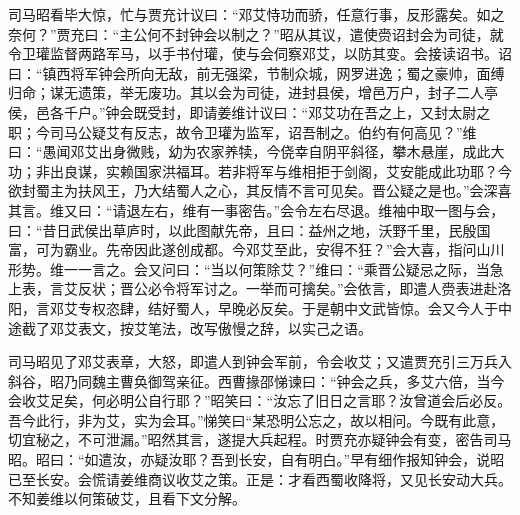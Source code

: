 司马昭看毕大惊，忙与贾充计议曰：“邓艾恃功而骄，任意行事，反形露矣。如之奈何？”贾充曰：“主公何不封钟会以制之？”昭从其议，遣使赍诏封会为司徒，就令卫瓘监督两路军马，以手书付瓘，使与会伺察邓艾，以防其变。会接读诏书。诏曰：“镇西将军钟会所向无敌，前无强梁，节制众城，网罗进逸；蜀之豪帅，面缚归命；谋无遗策，举无废功。其以会为司徒，进封县侯，增邑万户，封子二人亭侯，邑各千户。”钟会既受封，即请姜维计议曰：“邓艾功在吾之上，又封太尉之职；今司马公疑艾有反志，故令卫瓘为监军，诏吾制之。伯约有何高见？”维曰：“愚闻邓艾出身微贱，幼为农家养犊，今侥幸自阴平斜径，攀木悬崖，成此大功；非出良谋，实赖国家洪福耳。若非将军与维相拒于剑阁，艾安能成此功耶？今欲封蜀主为扶风王，乃大结蜀人之心，其反情不言可见矣。晋公疑之是也。”会深喜其言。维又曰：“请退左右，维有一事密告。”会令左右尽退。维袖中取一图与会，曰：“昔日武侯出草庐时，以此图献先帝，且曰：益州之地，沃野千里，民殷国富，可为霸业。先帝因此遂创成都。今邓艾至此，安得不狂？”会大喜，指问山川形势。维一一言之。会又问曰：“当以何策除艾？”维曰：“乘晋公疑忌之际，当急上表，言艾反状；晋公必令将军讨之。一举而可擒矣。”会依言，即遣人赍表进赴洛阳，言邓艾专权恣肆，结好蜀人，早晚必反矣。于是朝中文武皆惊。会又今人于中途截了邓艾表文，按艾笔法，改写傲慢之辞，以实己之语。

司马昭见了邓艾表章，大怒，即遣人到钟会军前，令会收艾；又遣贾充引三万兵入斜谷，昭乃同魏主曹奂御驾亲征。西曹掾邵悌谏曰：“钟会之兵，多艾六倍，当今会收艾足矣，何必明公自行耶？”昭笑曰：“汝忘了旧日之言耶？汝曾道会后必反。吾今此行，非为艾，实为会耳。”悌笑曰“某恐明公忘之，故以相问。今既有此意，切宜秘之，不可泄漏。”昭然其言，遂提大兵起程。时贾充亦疑钟会有变，密告司马昭。昭曰：“如遣汝，亦疑汝耶？吾到长安，自有明白。”早有细作报知钟会，说昭已至长安。会慌请姜维商议收艾之策。正是：才看西蜀收降将，又见长安动大兵。不知姜维以何策破艾，且看下文分解。